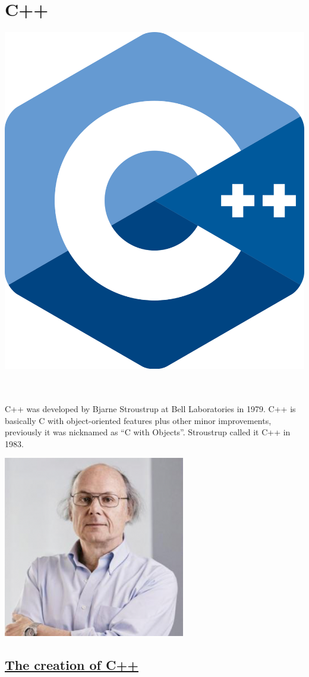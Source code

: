 \documentclass[[12pt]{article}
\begin{document}
	\section* {\Huge{C++}}	
	\includegraphics[width= 0.1\linewidth]{pics/C+logo.png} \raggedright\\
	\begin{minipage}{0.59\linewidth}		
		\paragraph{}
		\large C++ was developed by Bjarne Stroustrup at Bell Laboratories in 1979. C++ is basically C with object-oriented features plus other minor improvements, previously it was nicknamed as “C with Objects”. Stroustrup called it C++ in 1983.		
	\end{minipage}
	\begin{minipage}{0.39\linewidth}
		\includegraphics[width= \linewidth]{pics/stroustrup_500.png}
	\end{minipage}
	\subsection*{\Large \underline{The creation of C++ }}
\end{document}
